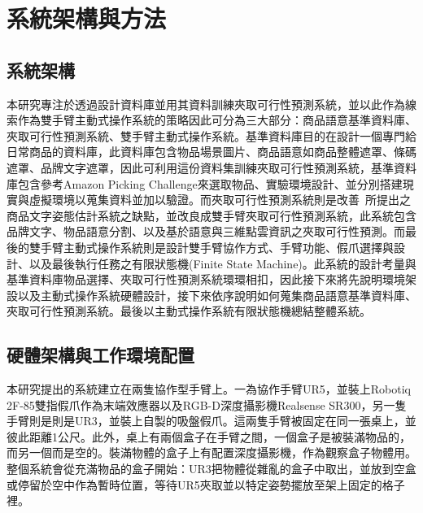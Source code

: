 \chapter{系統架構與方法}
\label{chapter:system}



\section{系統架構}
\label{sec:systemarchi}
本研究專注於透過設計資料庫並用其資料訓練夾取可行性預測系統，並以此作為線索作為雙手臂主動式操作系統的策略因此可分為三大部分：商品語意基準資料庫、夾取可行性預測系統、雙手臂主動式操作系統。基準資料庫目的在設計一個專門給日常商品的資料庫，此資料庫包含物品場景圖片、商品語意如商品整體遮罩、條碼遮罩、品牌文字遮罩，因此可利用這份資料集訓練夾取可行性預測系統，基準資料庫包含參考Amazon Picking Challenge來選取物品、實驗環境設計、並分別搭建現實與虛擬環境以蒐集資料並加以驗證。而夾取可行性預測系統則是改善~\cite{peterthesis}所提出之商品文字姿態估計系統之缺點，並改良成雙手臂夾取可行性預測系統，此系統包含品牌文字、物品語意分割、以及基於語意與三維點雲資訊之夾取可行性預測。而最後的雙手臂主動式操作系統則是設計雙手臂協作方式、手臂功能、假爪選擇與設計、以及最後執行任務之有限狀態機(Finite State Machine)。此系統的設計考量與基準資料庫物品選擇、夾取可行性預測系統環環相扣，因此接下來將先說明環境架設以及主動式操作系統硬體設計，接下來依序說明如何蒐集商品語意基準資料庫、夾取可行性預測系統。最後以主動式操作系統有限狀態機總結整體系統。

\section{硬體架構與工作環境配置}
本研究提出的系統建立在兩隻協作型手臂上。一為協作手臂UR5，並裝上Robotiq 2F-85雙指假爪作為末端效應器以及RGB-D深度攝影機Realsense SR300，另一隻手臂則是則是UR3，並裝上自製的吸盤假爪。這兩隻手臂被固定在同一張桌上，並彼此距離1公尺。此外，桌上有兩個盒子在手臂之間，一個盒子是被裝滿物品的，而另一個而是空的。裝滿物體的盒子上有配置深度攝影機，作為觀察盒子物體用。整個系統會從充滿物品的盒子開始：UR3把物體從雜亂的盒子中取出，並放到空盒或停留於空中作為暫時位置，等待UR5夾取並以特定姿勢擺放至架上固定的格子裡。


